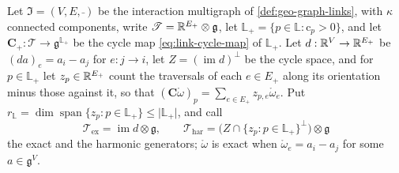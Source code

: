 Let $\mathfrak I=(V,E,\bar{\ })$ be the interaction multigraph of \cref{def:geo-graph-links}, with
$\kappa$ connected components, write $\mathscr T=\mathbb R^{E_+}\otimes\mathfrak g$, let
$\mathbb L_+=\{p\in\mathbb L:\mathrm c_p>0\}$, and let $\mathbf C_+:\mathscr T\to\mathfrak g^{\mathbb L_+}$ be the
cycle map \eqref{eq:link-cycle-map} of $\mathbb L_+$. Let $d:\mathbb R^V\to\mathbb R^{E_+}$ be $(da)_e=a_i-a_j$ for
$e:j\to i$, let $Z=(\operatorname{im}d)^\perp$ be the cycle space, and for $p\in\mathbb L_+$ let
$z_p\in\mathbb R^{E_+}$ count the traversals of each $e\in E_+$ along its orientation minus those against it,
so that $(\mathbf C\mathring\omega)_p=\sum_{e\in E_+}z_{p,e}\mathring\omega_e$. Put
$r_{\mathbb L}=\dim\operatorname{span}\{z_p:p\in\mathbb L_+\}\leq\lvert\mathbb L_+\rvert$, and call
\begin{equation}
\mathscr T_{\mathrm{ex}}=\operatorname{im}d\otimes\mathfrak g,
\qquad
\mathscr T_{\mathrm{har}}=\bigl(Z\cap\{z_p:p\in\mathbb L_+\}^\perp\bigr)\otimes\mathfrak g
\label{eq:link-exact-harmonic}
\end{equation}
the exact and the harmonic generators; $\mathring\omega$ is exact when $\mathring\omega_e=a_i-a_j$ for some
$a\in\mathfrak g^V$.
